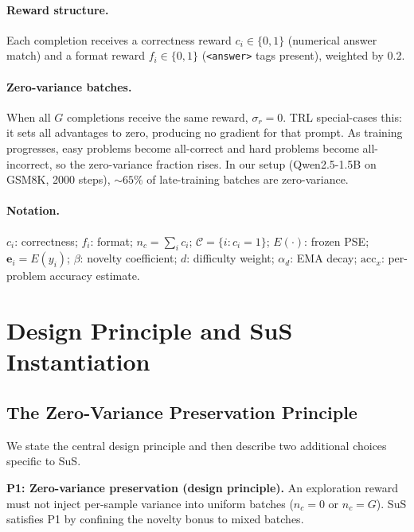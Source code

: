 \documentclass[10pt]{article}
\begin{document}
\paragraph{Reward structure.}
Each completion receives a correctness reward $c_i \in \{0, 1\}$ (numerical answer match) and a format reward $f_i \in \{0, 1\}$ (\texttt{<answer>} tags present), weighted by 0.2.

\paragraph{Zero-variance batches.}
When all $G$ completions receive the same reward, $\sigma_r = 0$. TRL special-cases this: it sets all advantages to zero, producing no gradient for that prompt. As training progresses, easy problems become all-correct and hard problems become all-incorrect, so the zero-variance fraction rises. In our setup (Qwen2.5-1.5B on GSM8K, 2000 steps), ${\sim}65\%$ of late-training batches are zero-variance.

\paragraph{Notation.}
$c_i$: correctness; $f_i$: format; $n_c = \sum_i c_i$; $\mathcal{C} = \{i : c_i = 1\}$; $E(\cdot)$: frozen PSE; $\mathbf{e}_i = E(y_i)$; $\beta$: novelty coefficient; $d$: difficulty weight; $\alpha_d$: EMA decay; $\text{acc}_x$: per-problem accuracy estimate.

\section{Design Principle and SuS Instantiation}
\label{sec:method}

\subsection{The Zero-Variance Preservation Principle}
\label{sec:design_principles}

We state the central design principle and then describe two additional choices specific to SuS.

\textbf{P1: Zero-variance preservation (design principle).}
An exploration reward must not inject per-sample variance into uniform batches ($n_c = 0$ or $n_c = G$). SuS satisfies P1 by confining the novelty bonus to mixed batches.
\end{document}
